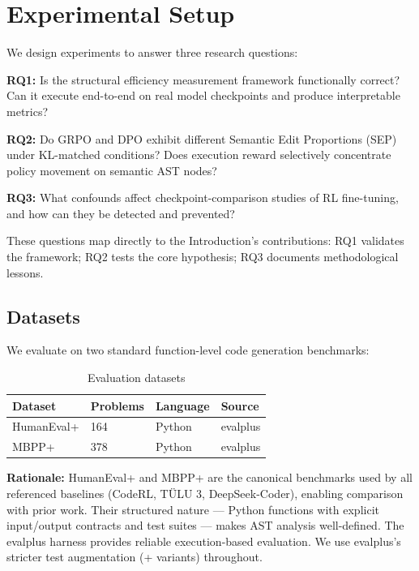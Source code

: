 \section{Experimental Setup}
\label{sec:setup}

We design experiments to answer three research questions:

\textbf{RQ1:} Is the structural efficiency measurement framework functionally correct?
Can it execute end-to-end on real model checkpoints and produce interpretable metrics?

\textbf{RQ2:} Do GRPO and DPO exhibit different Semantic Edit Proportions (SEP)
under KL-matched conditions? Does execution reward selectively concentrate
policy movement on semantic AST nodes?

\textbf{RQ3:} What confounds affect checkpoint-comparison studies of RL fine-tuning,
and how can they be detected and prevented?

These questions map directly to the Introduction's contributions: RQ1 validates
the framework; RQ2 tests the core hypothesis; RQ3 documents methodological lessons.

\subsection{Datasets}

We evaluate on two standard function-level code generation benchmarks:

\begin{table}[h]
\centering
\caption{Evaluation datasets}
\label{tab:datasets}
\begin{tabular}{llll}
\toprule
\textbf{Dataset} & \textbf{Problems} & \textbf{Language} & \textbf{Source} \\
\midrule
HumanEval+ & 164 & Python & evalplus \cite{Liu2023EvalPlus} \\
MBPP+ & 378 & Python & evalplus \cite{Liu2023EvalPlus} \\
\bottomrule
\end{tabular}
\end{table}

\textbf{Rationale:} HumanEval+ and MBPP+ are the canonical benchmarks used by all
referenced baselines (CodeRL, T\"{U}LU 3, DeepSeek-Coder), enabling
comparison with prior work. Their structured nature --- Python functions with
explicit input/output contracts and test suites --- makes AST analysis
well-defined. The evalplus harness provides reliable execution-based evaluation.
We use evalplus's stricter test augmentation (+ variants) throughout.

